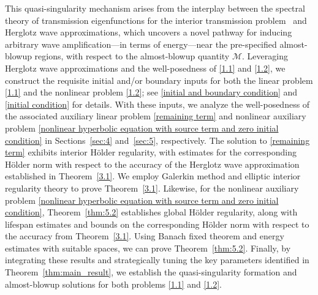 \documentclass[11pt,reqno,oneside]{amsart}
\numberwithin{equation}{section}
\theoremstyle{definition}
\theoremstyle{remark}
\numberwithin{equation}{section}
\begin{document}
	
	
	This quasi-singularity mechanism arises from the interplay between the spectral theory of transmission eigenfunctions for the interior transmission problem~\cite{ColtonKress} and Herglotz wave approximations, which uncovers a novel pathway for inducing arbitrary wave amplification---in terms of energy---near the pre-specified almost-blowup regions, with respect to the almost-blowup quantity $\mathcal{M}$. Leveraging Herglotz wave approximations and the well-posedness of \eqref{1.1} and \eqref{1.2}, we construct the requisite initial and/or boundary inputs for both the linear problem \eqref{1.1} and the nonlinear problem \eqref{1.2}; see \eqref{initial and boundary condition} and \eqref{initial condition} for details. With these inputs, we analyze the well-posedness of the associated auxiliary linear problem \eqref{remaining term} and nonlinear auxiliary problem \eqref{nonlinear hyperbolic equation with source term and zero initial condition} in Sections~\ref{sec:4} and~\ref{sec:5}, respectively. The solution to \eqref{remaining term} exhibits interior H\"older regularity, with estimates for the corresponding H\"older norm with respect to the accuracy of the Herglotz wave approximation established in Theorem~\ref{3.1}. We employ Galerkin method and elliptic interior regularity theory to prove Theorem~\ref{3.1}.  Likewise, for the nonlinear auxiliary problem \eqref{nonlinear hyperbolic equation with source term and zero initial condition}, Theorem~\ref{thm:5.2} establishes global H\"older regularity, along with lifespan estimates and bounds on the corresponding H\"older norm with respect  to the accuracy from Theorem~\ref{3.1}. Using Banach fixed theorem and energy estimates with suitable spaces, we can prove Theorem~\ref{thm:5.2}.  Finally, by integrating these results and strategically tuning the key parameters identified in Theorem~\ref{thm:main_result}, we establish the quasi-singularity formation and almost-blowup solutions for both problems \eqref{1.1} and \eqref{1.2}.
	
	
	
\end{document}
